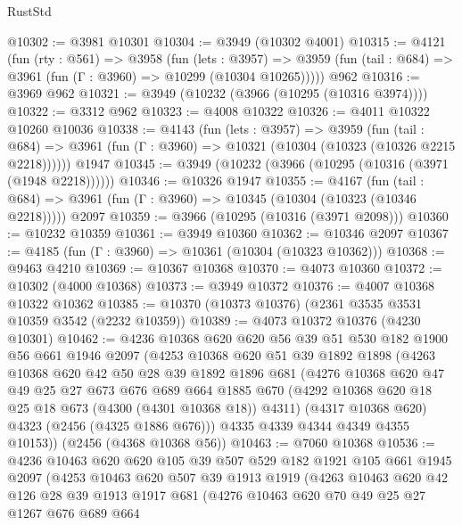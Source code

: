 \begin{lexlean}{RustStd}
\begin{coremodule}
@10302 := @3981 @10301
@10304 := @3949 (@10302 @4001)
@10315 := @4121
    (fun (rty : @561) =>
    @3958
      (fun (lets : @3957) =>
      @3959 (fun (tail : @684) => @3961 (fun (Γ : @3960) => @10299 (@10304 @10265)))))
    @962
@10316 := @3969 @962
@10321 := @3949 (@10232 (@3966 (@10295 (@10316 @3974))))
@10322 := @3312 @962
@10323 := @4008 @10322
@10326 := @4011 @10322 @10260 @10036
@10338 := @4143
    (fun (lets : @3957) =>
    @3959
      (fun (tail : @684) =>
      @3961 (fun (Γ : @3960) => @10321 (@10304 (@10323 (@10326 @2215 @2218))))))
    @1947
@10345 := @3949 (@10232 (@3966 (@10295 (@10316 (@3971 (@1948 @2218))))))
@10346 := @10326 @1947
@10355 := @4167
    (fun (tail : @684) => @3961 (fun (Γ : @3960) => @10345 (@10304 (@10323 (@10346 @2218)))))
    @2097
@10359 := @3966 (@10295 (@10316 (@3971 @2098)))
@10360 := @10232 @10359
@10361 := @3949 @10360
@10362 := @10346 @2097
@10367 := @4185 (fun (Γ : @3960) => @10361 (@10304 (@10323 @10362)))
@10368 := @9463 @4210
@10369 := @10367 @10368
@10370 := @4073 @10360
@10372 := @10302 (@4000 @10368)
@10373 := @3949 @10372
@10376 := @4007 @10368 @10322 @10362
@10385 := @10370 (@10373 @10376) (@2361 @3535 @3531 @10359 @3542 (@2232 @10359))
@10389 := @4073 @10372 @10376 (@4230 @10301)
@10462 := @4236
    @10368
    @620
    @620
    @56
    @39
    @51
    @530
    @182
    @1900
    @56
    @661
    @1946
    @2097
    (@4253
      @10368
      @620
      @51
      @39
      @1892
      @1898
      (@4263
        @10368
        @620
        @42
        @50
        @28
        @39
        @1892
        @1896
        @681
        (@4276
          @10368
          @620
          @47
          @49
          @25
          @27
          @673
          @676
          @689
          @664
          @1885
          @670
          (@4292 @10368 @620 @18 @25 @18 @673 (@4300 (@4301 @10368 @18)) @4311)
          (@4317 @10368 @620)
          @4323
          (@2456 (@4325 @1886 @676)))
        @4335
        @4339
        @4344
        @4349
        @4355
        @10153))
    (@2456 (@4368 @10368 @56))
@10463 := @7060 @10368
@10536 := @4236
    @10463
    @620
    @620
    @105
    @39
    @507
    @529
    @182
    @1921
    @105
    @661
    @1945
    @2097
    (@4253
      @10463
      @620
      @507
      @39
      @1913
      @1919
      (@4263
        @10463
        @620
        @42
        @126
        @28
        @39
        @1913
        @1917
        @681
        (@4276
          @10463
          @620
          @70
          @49
          @25
          @27
          @1267
          @676
          @689
          @664

\end{coremodule}
\end{lexlean}
